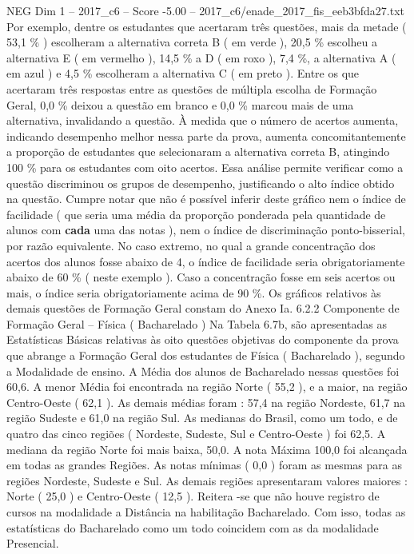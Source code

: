 \begin{textsample}{NEG Dim 1 – 2017\_c6 – Score -5.00 – 2017\_c6/enade\_2017\_fis\_eeb3bfda27.txt}
Por exemplo, dentre os estudantes que acertaram três questões, mais da metade ( 53,1 \% ) escolheram a alternativa correta B ( em verde ), 20,5 \% escolheu a alternativa E ( em vermelho ), 14,5 \% a D ( em roxo ), 7,4 \%, a alternativa A ( em azul ) e 4,5 \% escolheram a alternativa C ( em preto ).
Entre os que acertaram três respostas entre as questões de múltipla escolha de Formação Geral, 0,0 \% deixou a questão em branco e 0,0 \% marcou mais de uma alternativa, invalidando a questão.
À medida que o número de acertos aumenta, indicando desempenho melhor nessa parte da prova, aumenta concomitantemente a proporção de estudantes que selecionaram a alternativa correta B, atingindo 100 \% para os estudantes com oito acertos.
Essa análise permite verificar como a questão discriminou os grupos de desempenho, justificando o alto índice obtido na questão.
Cumpre notar que não é possível inferir deste gráfico nem o índice de facilidade ( que seria uma média da proporção ponderada pela quantidade de alunos com \textbf{cada} uma das notas ), nem o índice de discriminação ponto-bisserial, por razão equivalente.
No caso extremo, no qual a grande concentração dos acertos dos alunos fosse abaixo de 4, o índice de facilidade seria obrigatoriamente abaixo de 60 \% ( neste exemplo ).
Caso a concentração fosse em seis acertos ou mais, o índice seria obrigatoriamente acima de 90 \%.
Os gráficos relativos às demais questões de Formação Geral constam do Anexo Ia. 6.2.2 Componente de Formação Geral – Física ( Bacharelado ) Na Tabela 6.7b, são apresentadas as Estatísticas Básicas relativas às oito questões objetivas do componente da prova que abrange a Formação Geral dos estudantes de Física ( Bacharelado ), segundo a Modalidade de ensino.
A Média dos alunos de Bacharelado nessas questões foi 60,6.
A menor Média foi encontrada na região Norte ( 55,2 ), e a maior, na região Centro-Oeste ( 62,1 ).
As demais médias foram : 57,4 na região Nordeste, 61,7 na região Sudeste e 61,0 na região Sul.
As medianas do Brasil, como um todo, e de quatro das cinco regiões ( Nordeste, Sudeste, Sul e Centro-Oeste ) foi 62,5.
A mediana da região Norte foi mais baixa, 50,0.
A nota Máxima 100,0 foi alcançada em todas as grandes Regiões.
As notas mínimas ( 0,0 ) foram as mesmas para as regiões Nordeste, Sudeste e Sul.
As demais regiões apresentaram valores maiores : Norte ( 25,0 ) e Centro-Oeste ( 12,5 ).
Reitera -se que não houve registro de cursos na modalidade a Distância na habilitação Bacharelado.
Com isso, todas as estatísticas do Bacharelado como um todo coincidem com as da modalidade Presencial.

\end{textsample}
